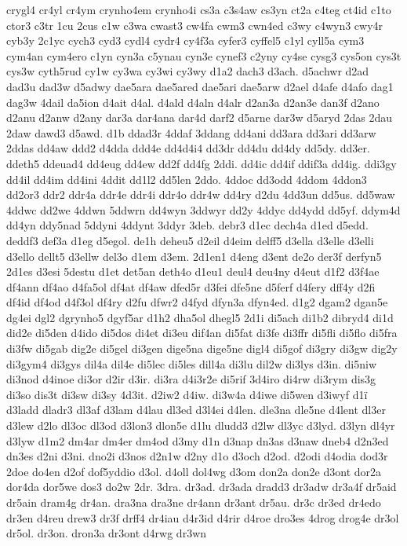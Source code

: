 {crygl4
cr4yl
cr4ym
crynho4em
crynho4i
cs3a
c3s4aw
cs3yn
ct2a
c4teg
ct4id
c1to
ctor3
c3tr
1cu
2cus
c1w
c3wa
cwast3
cw4fa
cwm3
cwn4ed
c3wy
c4wyn3
cwy4r
cyb3y
2c1yc
cych3
cyd3
cydl4
cydr4
cy4f3a
cyfer3
cyffel5
c1yl
cyll5a
cym3
cym4an
cym4ero
c1yn
cyn3a
c5ynau
cyn3e
cynef3
c2yny
cy4se
cysg3
cys5on
cys3t
cys3w
cyth5rud
cy1w
cy3wa
cy3wi
cy3wy
d1a2
dach3
d3ach.
d5achwr
d2ad
dad3u
dad3w
d5adwy
dae5ara
dae5ared
dae5ari
dae5arw
d2ael
d4afe
d4afo
dag1
dag3w
4dail
da5ion
d4ait
d4al.
d4ald
d4aln
d4alr
d2an3a
d2an3e
dan3f
d2ano
d2anu
d2anw
d2any
dar3a
dar4ana
dar4d
darf2
d5arne
dar3w
d5aryd
2das
2dau
2daw
dawd3
d5awd.
d1b
ddad3r
4ddaf
3ddang
dd4ani
dd3ara
dd3ari
dd3arw
2ddas
dd4aw
ddd2
d4dda
ddd4e
dd4d4i4
dd3dr
dd4du
dd4dy
dd5dy.
dd3er.
ddeth5
ddeuad4
dd4eug
dd4ew
dd2f
dd4fg
2ddi.
dd4ic
dd4if
ddif3a
dd4ig.
ddi3gy
dd4il
dd4im
dd4ini
4ddit
dd1l2
dd5len
2ddo.
4ddoc
dd3odd
4ddom
4ddon3
dd2or3
ddr2
ddr4a
ddr4e
ddr4i
ddr4o
ddr4w
dd4ry
d2du
4dd3un
dd5us.
dd5waw
4ddwc
dd2we
4ddwn
5ddwrn
dd4wyn
3ddwyr
dd2y
4ddyc
dd4ydd
dd5yf.
ddym4d
dd4yn
ddy5nad
5ddyni
4ddynt
3ddyr
3deb.
debr3
d1ec
dech4a
d1ed
d5edd.
deddf3
def3a
d1eg
d5egol.
de1h
deheu5
d2eil
d4eim
delff5
d3ella
d3elle
d3elli
d3ello
dellt5
d3ellw
del3o
d1em
d3em.
2d1en1
d4eng
d3ent
de2o
der3f
derfyn5
2d1es
d3esi
5destu
d1et
det5an
deth4o
d1eu1
deul4
deu4ny
d4eut
d1f2
d3f4ae
df4ann
df4ao
d4fa5ol
df4at
df4aw
dfed5r
d3fei
dfe5ne
d5ferf
d4fery
dff4y
d2fi
df4id
df4od
d4f3ol
df4ry
d2fu
dfwr2
d4fyd
dfyn3a
dfyn4ed.
d1g2
dgam2
dgan5e
dg4ei
dgl2
dgrynho5
dgyf5ar
d1h2
dha5ol
dhegl5
2d1i
di5ach
di1b2
dibryd4
di1d
did2e
di5den
d4ido
di5dos
di4et
di3eu
dif4an
di5fat
di3fe
di3ffr
di5fli
di5flo
di5fra
di3fw
di5gab
dig2e
di5gel
di3gen
dige5na
dige5ne
digl4
di5gof
di3gry
di3gw
dig2y
di3gym4
di3gys
dil4a
dil4e
di5lec
di5les
dill4a
di3lu
dil2w
di3lys
d3in.
di5niw
di3nod
d4inoe
di3or
d2ir
d3ir.
di3ra
d4i3r2e
di5rif
3d4iro
di4rw
di3rym
dis3g
di3so
dis3t
di3sw
di3sy
4d3it.
d2iw2
d4iw.
di3w4a
d4iwe
di5wen
d3iwyf
d1ï
d3ladd
dladr3
dl3af
d3lam
d4lau
dl3ed
d3l4ei
d4len.
dle3na
dle5ne
d4lent
dl3er
d3lew
d2lo
dl3oc
dl3od
d3lon3
dlon5e
d1lu
dludd3
d2lw
dl3yc
d3lyd.
d3lyn
dl4yr
d3lyw
d1m2
dm4ar
dm4er
dm4od
d3my
d1n
d3nap
dn3as
d3naw
dneb4
d2n3ed
dn3es
d2ni
d3ni.
dno2i
d3nos
d2n1w
d2ny
d1o
d3och
d2od.
d2odi
d4odia
dod3r
2doe
do4en
d2of
dof5yddio
d3ol.
d4oll
dol4wg
d3om
don2a
don2e
d3ont
dor2a
dor4da
dor5we
dos3
do2w
2dr.
3dra.
dr3ad.
dr3ada
dradd3
dr3adw
dr3a4f
dr5aid
dr5ain
dram4g
dr4an.
dra3na
dra3ne
dr4ann
dr3ant
dr5au.
dr3c
dr3ed
dr4edo
dr3en
d4reu
drew3
dr3f
drff4
dr4iau
d4r3id
d4rir
d4roe
dro3es
4drog
drog4e
dr3ol
dr5ol.
dr3on.
dron3a
dr3ont
d4rwg
dr3wn
}
